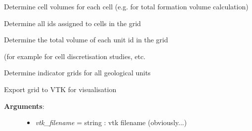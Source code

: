 \documentclass[letterpaper,10pt,english]{sphinxmanual}
\begin{document}
\begin{fulllineitems}

\begin{fulllineitems}
\label{pygeomod:pygeomod.geogrid.GeoGrid.determine_cell_volumes}
Determine cell volumes for each cell (e.g. for total formation volume calculation)

\end{fulllineitems}


\begin{fulllineitems}
\label{pygeomod:pygeomod.geogrid.GeoGrid.determine_geology_ids}
Determine all ids assigned to cells in the grid

\end{fulllineitems}


\begin{fulllineitems}
\label{pygeomod:pygeomod.geogrid.GeoGrid.determine_id_volumes}
Determine the total volume of each unit id in the grid

(for example for cell discretisation studies, etc.

\end{fulllineitems}


\begin{fulllineitems}
\label{pygeomod:pygeomod.geogrid.GeoGrid.determine_indicator_grids}
Determine indicator grids for all geological units

\end{fulllineitems}


\begin{fulllineitems}
\label{pygeomod:pygeomod.geogrid.GeoGrid.export_to_vtk}
Export grid to VTK for visualisation
\begin{description}
\item[{\textbf{Arguments}:}] \leavevmode\begin{itemize}
\item {} 
\emph{vtk\_filename} = string : vtk filename (obviously...)


\end{itemize}
\end{description}
\end{fulllineitems}
\end{fulllineitems}
\end{document}
